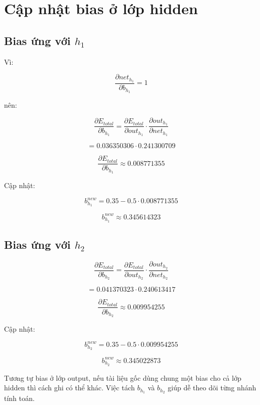 \section{Cập nhật bias ở lớp hidden}

\subsection{Bias ứng với $h_1$}

Vì:

\[
    \frac{\partial net_{h_1}}{\partial b_{h_1}}=1
\]

nên:

\[
    \frac{\partial E_{total}}{\partial b_{h_1}}
    =
    \frac{\partial E_{total}}{\partial out_{h_1}}
    \cdot
    \frac{\partial out_{h_1}}{\partial net_{h_1}}
\]

\[
    =
    0.036350306
    \cdot
    0.241300709
\]

\[
    \frac{\partial E_{total}}{\partial b_{h_1}}
    \approx 0.008771355
\]

Cập nhật:

\[
    b_{h_1}^{new}
    =
    0.35
    -
    0.5\cdot 0.008771355
\]

\[
    b_{h_1}^{new}
    \approx 0.345614323
\]

\subsection{Bias ứng với $h_2$}

\[
    \frac{\partial E_{total}}{\partial b_{h_2}}
    =
    \frac{\partial E_{total}}{\partial out_{h_2}}
    \cdot
    \frac{\partial out_{h_2}}{\partial net_{h_2}}
\]

\[
    =
    0.041370323
    \cdot
    0.240613417
\]

\[
    \frac{\partial E_{total}}{\partial b_{h_2}}
    \approx 0.009954255
\]

Cập nhật:

\[
    b_{h_2}^{new}
    =
    0.35
    -
    0.5\cdot 0.009954255
\]

\[
    b_{h_2}^{new}
    \approx 0.345022873
\]

\begin{luuy}
Tương tự bias ở lớp output, nếu tài liệu gốc dùng chung một bias cho cả lớp hidden thì cách ghi có thể khác. Việc tách $b_{h_1}$ và $b_{h_2}$ giúp dễ theo dõi từng nhánh tính toán.
\end{luuy}

